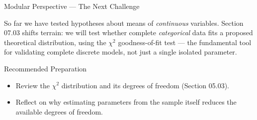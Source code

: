 \documentclass[10pt, aspectratio=169]{beamer}
\begin{document}
\begin{frame}{Modular Perspective --- The Next Challenge}
  \scriptsize
  \begin{retoclase}
    So far we have tested hypotheses about means of \emph{continuous} variables. Section 07.03 shifts terrain: we will test whether complete \emph{categorical} data fits a proposed theoretical distribution, using the $\chi^2$ goodness-of-fit test --- the fundamental tool for validating complete discrete models, not just a single isolated parameter.
  \end{retoclase}

  \vspace{0.08cm}
  \pause
  \begin{alertblock}{Recommended Preparation}
    \begin{itemize}\itemsep=0.06cm
      \item Review the $\chi^2$ distribution and its degrees of freedom (Section 05.03).
      \item Reflect on why estimating parameters from the sample itself reduces the available degrees of freedom.
    \end{itemize}
  \end{alertblock}
\end{frame}
\end{document}
